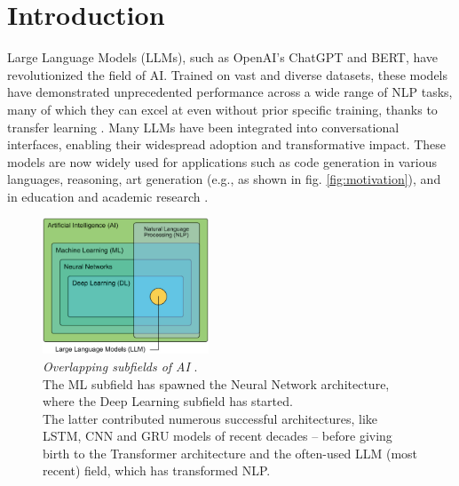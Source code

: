 \documentclass[11pt]{article}
\begin{document}
\section{Introduction}

Large Language Models (LLMs), such as OpenAI's ChatGPT and BERT, have revolutionized the field of AI. Trained on vast and diverse datasets, these models have demonstrated unprecedented performance across a wide range of NLP tasks, many of which they can excel at even without prior specific training, thanks to transfer learning \citep{bommasani22-foundation-models}. Many LLMs have been integrated into conversational interfaces, enabling their widespread adoption and transformative impact. These models are now widely used for applications such as code generation in various languages, reasoning, art generation (e.g., as shown in fig. \ref{fig:motivation}), and in education and academic research \citep{schmidt24-prompt-catalog, lee24-potential-pragmatics}.

\begin{figure}[h!]
    \centering
    \includegraphics[width=0.44\textwidth]{llm-nlp-ml-relationship.png}
    \caption{\textit{Overlapping subfields of AI} \citep{lee24-potential-pragmatics}. \\ The ML subfield has spawned the Neural Network architecture, where the Deep Learning subfield has started. \\ The latter contributed numerous successful architectures, like LSTM, CNN and GRU models of recent decades -- before giving birth to the Transformer architecture and the often-used LLM (most recent) field, which has transformed NLP.}
    \label{fig:llms-ai-subfields}
\end{figure}
\end{document}
